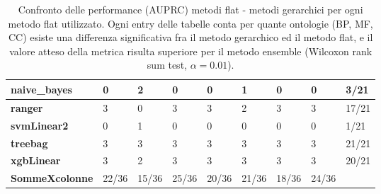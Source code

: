\documentclass[12pt]{report}
\begin{document}
\begin{appendices}
\begin{table}[h!]
{\begin{tabular}{|l|l|l|l|l|l|l|l|l|}
\textbf{naive\_bayes}  & 0             & 2            & 0               & 0                   & 1               & 0                   & 0              & 3/21                 \\ \hline
\textbf{ranger}        & 3             & 0            & 3               & 3                   & 2               & 3                   & 3              & 17/21                \\ \hline
\textbf{svmLinear2}    & 0             & 1            & 0               & 0                   & 0               & 0                   & 0              & 1/21                 \\ \hline
\textbf{treebag}       & 3             & 3            & 3               & 3                   & 3               & 3                   & 3              & 21/21                \\ \hline
\textbf{xgbLinear}     & 3             & 2            & 3               & 3                   & 3               & 3                   & 3              & 20/21                \\ \hline
\textbf{SommeXcolonne} & 22/36         & 15/36        & 25/36           & 20/36               & 21/36           & 18/36               & 24/36          &                      \\ \hline
\end{tabular}}
\caption{\footnotesize{Confronto delle performance (AUPRC) metodi flat - metodi gerarchici per ogni metodo flat utilizzato. Ogni entry delle tabelle conta per quante ontologie (BP, MF, CC) esiste una differenza significativa fra il metodo gerarchico ed il metodo flat, e il valore atteso della metrica risulta superiore per il metodo ensemble (Wilcoxon rank sum test, $\alpha = 0.01$).}}
\label{AUPRC_1_}
\end{table}



\begin{table}[h!]


\end{table}
\end{appendices}
\end{document}

